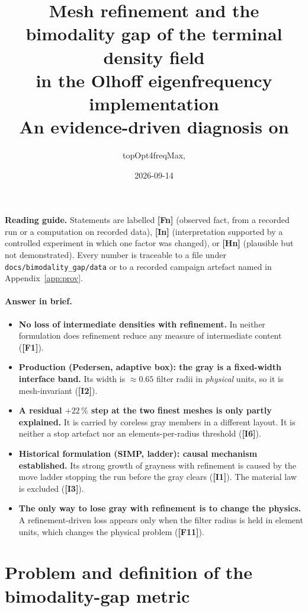 \documentclass[10pt,a4paper]{article}
\title{Mesh refinement and the bimodality gap of the terminal density field\\ in the Olhoff eigenfrequency implementation\\[3pt]\large An evidence-driven diagnosis on \code{analysis/OlhoffCurrent}}
\author{topOpt4freqMax, \code{docs/bimodality\_gap}}
\date{2026-09-14}
\newcommand{\code}[1]{\texttt{\small #1}}
\newcommand{\fact}[1]{\textbf{[F#1]}}
\newcommand{\interp}[1]{\textbf{[I#1]}}
\newcommand{\hyp}[1]{\textbf{[H#1]}}
\begin{document}
\maketitle
\vspace{-1.5em}
\noindent\textbf{Reading guide.} Statements are labelled \fact{n} (observed fact, from a recorded run or a computation on recorded data), \interp{n} (interpretation supported by a controlled experiment in which one factor was changed), or \hyp{n} (plausible but not demonstrated). Every number is traceable to a file under \code{docs/bimodality\_gap/data} or to a recorded campaign artefact named in Appendix~\ref{app:prov}.

\paragraph{Answer in brief.}
\begin{itemize}
\item \textbf{No loss of intermediate densities with refinement.} In neither formulation does refinement reduce any measure of intermediate content (\fact{1}).
\item \textbf{Production (Pedersen, adaptive box): the gray is a fixed-width interface band.} Its width is $\approx0.65$ filter radii in \emph{physical} units, so it is mesh-invariant (\interp{2}).
\item \textbf{A residual $+22\,\%$ step at the two finest meshes is only partly explained.} It is carried by coreless gray members in a different layout. It is neither a stop artefact nor an elements-per-radius threshold (\interp{6}).
\item \textbf{Historical formulation (SIMP, ladder): causal mechanism established.} Its strong growth of grayness with refinement is caused by the move ladder stopping the run before the gray clears (\interp{1}). The material law is excluded (\interp{3}).
\item \textbf{The only way to lose gray with refinement is to change the physics.} A refinement-driven loss appears only when the filter radius is held in element units, which changes the physical problem (\fact{11}).
\end{itemize}

\section{Problem and definition of the bimodality-gap metric}

\begingroup\sloppy
\end{document}
